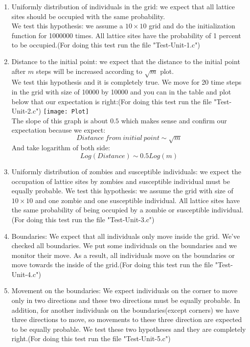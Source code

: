 \documentclass[12pt]{article}
\begin{document}
\begin{enumerate}
\item Uniformly distribution of individuals in the grid: we expect that all lattice sites should be occupied with the same probability.\\
We test this hypothesis: we assume a $10\times10$ grid and do the initialization function for 1000000 times. All lattice sites have the probability of 1 percent to be occupied.(For doing this test run the file "Test-Unit-1.c")
\item Distance to the initial point: we expect that the distance to the initial point after $m$ steps will be increased according to $\sqrt{m}$ plot.\\
We test this hypothesis and it is completely true. We move for 20 time steps in the grid with size of 10000 by 10000 and you can in the table and plot below that our expectation is right:(For doing this test run the file "Test-Unit-2.c")
{\centering
\texttt{[image: Plot]}\\}
\hfill \break
The slope of this graph is about $0.5$ which makes sense and confirm our expectation because we expect:
$$Distance\:from\:initial\:point \sim \sqrt{m}$$
And take logarithm of both side:
$$Log(Distance)\sim 0.5Log(m)$$
\item Uniformly distribution of zombies and susceptible individuals: we expect the occupation of lattice sites by zombies and susceptible individual must be equally probable.
We test this hypothesis: we assume the grid with size of $10\times10$ and one zombie and one susceptible individual. All lattice sites have the same probability of being occupied by a zombie or susceptible individual.(For doing this test run the file "Test-Unit-3.c")
\item Boundaries: We expect that all individuals only move inside the grid.
We've checked all boundaries. We put some individuals on the boundaries and we monitor their move. As a result, all individuals move on the boundaries or move towards the inside of the grid.(For doing this test run the file "Test-Unit-4.c")
\item Movement on the boundaries: We expect individuals on the corner to move only in two directions and these two directions must be equally probable. In addition, for another individuals on the boundaries(except corners) we have three directions to move, so movements to these three direction are expected to be equally probable.
We test these two hypotheses and they are completely right.(For doing this test run the file "Test-Unit-5.c")
\end{enumerate}
\end{document}
